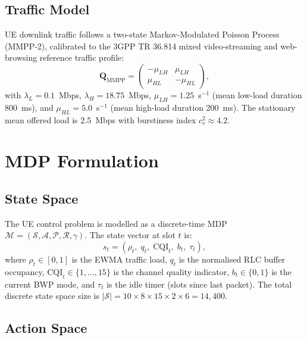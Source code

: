 \documentclass[conference]{IEEEtran}
\begin{document}
\subsection{Traffic Model}

UE downlink traffic follows a two-state Markov-Modulated Poisson Process
(MMPP-2), calibrated to the 3GPP TR 36.814 mixed video-streaming and
web-browsing reference traffic profile:
\begin{equation}
  \mathbf{Q}_{\mathrm{MMPP}} =
  \begin{pmatrix} -\mu_{LH} & \mu_{LH} \\ \mu_{HL} & -\mu_{HL} \end{pmatrix},
  \label{eq:mmpp}
\end{equation}
with $\lambda_L = 0.1$~Mbps, $\lambda_H = 18.75$~Mbps,
$\mu_{LH} = 1.25$~s$^{-1}$ (mean low-load duration 800~ms), and
$\mu_{HL} = 5.0$~s$^{-1}$ (mean high-load duration 200~ms).
The stationary mean offered load is 2.5~Mbps with burstiness index
$c_v^2 \approx 4.2$.

\section{MDP Formulation}
\label{sec:mdp}

\subsection{State Space}

The UE control problem is modelled as a discrete-time MDP
$\mathcal{M} = (\mathcal{S}, \mathcal{A}, \mathcal{P}, \mathcal{R}, \gamma)$.
The state vector at slot $t$ is:
\begin{equation}
  s_t = \left(\rho_t,\; q_t,\; \mathrm{CQI}_t,\; b_t,\; \tau_t\right),
  \label{eq:state}
\end{equation}
where $\rho_t \in [0,1]$ is the EWMA traffic load, $q_t$ is the
normalised RLC buffer occupancy, $\mathrm{CQI}_t \in \{1,\ldots,15\}$
is the channel quality indicator, $b_t \in \{0,1\}$ is the current BWP
mode, and $\tau_t$ is the idle timer (slots since last packet).
The total discrete state space size is
$|\mathcal{S}| = 10 \times 8 \times 15 \times 2 \times 6 = 14{,}400$.

\subsection{Action Space}
\end{document}
